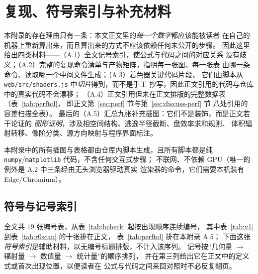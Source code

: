 \section{复现、符号索引与补充材料}\label{app:repro}

本附录的存在理由只有一条：本文正文里的\emph{每一个数字}都应该能被读者
在自己的机器上重新算出来，而且算出来的方式不应该依赖任何未公开的步骤。
因此这里给出四类材料——（A.1）全文记号索引，使公式与代码之间的对应关系
没有歧义；（A.2）完整的复现命令清单与产物矩阵，指明每一张图、每一张表
由哪一条命令、读取哪一个中间文件生成；（A.3）着色器关键代码片段，
它们由脚本从 \texttt{web/src/shaders.js} 中\emph{切片}得到，而不是手工
抄写，因此正文引用的代码与仓库中的真实代码不会漂移；
（A.4）正文引用但未在正文排版的完整数据表（表~\ref{tab:perftol}，
即正文第~\ref{sec:perf} 节与第~\ref{sec:discuss-perf} 节
八处引用的容差扫描全表）。
最后的（A.5）汇总九张补充插图：它们不是装饰，而是正文若干论证的
\emph{图形证明}，涉及相空间结构、逃逸半径截断、盘效率求和规则、
体积辐射转移、像阶分类、源方向映射与程序界面标注。

本附录中的所有插图与表格都由仓库内脚本生成，且所有脚本都是纯
\texttt{numpy}/\texttt{matplotlib} 代码，不含任何交互式步骤；
不联网、不依赖 GPU（唯一的例外是 A.2 中三条经由无头浏览器驱动真实
渲染器的命令，它们需要本机装有 Edge/Chromium）。

\subsection{符号与记号索引}\label{app:notation}

全文共 $19$ 张编号表，从表~\ref{tab:bcheck} 起按出现顺序连续编号，
其中表~\ref{tab:v1} 到表~\ref{tab:r0scan} 的十张排在正文，
表~\ref{tab:perftol} 排在本附录 A.5；
下面这张\emph{符号索引}是辅助材料，以无编号标题排版，不计入该序列。
记号按“几何量 $\to$ 辐射量 $\to$ 数值量 $\to$ 统计量”的顺序排列，
并在第三列给出它在正文中的定义式或首次出现位置，以便读者在
公式与代码之间来回对照时不必反复翻页。


